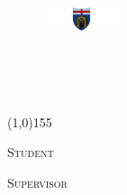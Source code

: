 \begin{frame}[plain,t]
	\begin{center}
		\scriptsize
		\textsc{\theInstitute}\\
		\vspace*{-0.35cm}\begin{figure}[htp]
			\centering\includegraphics[width=0.2\textwidth]{./figures/logo/unige.pdf}
    	\end{figure}
    	\vspace*{-0.3cm}
    	\textsc{\thePosition}\\
    	\scriptsize{\sc \theAccademicYear}\\
		\vfill

		\normalsize
	    {\em\textsc{\Large\theTitle}}\\
        \line(1,0){155}\\ 
        {\em\textsc{\theShortTitle}}
		\vfill

       \scriptsize
       \noindent\begin{minipage}{.4\linewidth}%
			{\textsc{Student}\hfill\\}
    		\theAuthor
		\end{minipage}\begin{minipage}{.4\linewidth}%
			\begin{flushright}
				\textsc{Supervisor}\\
    		  	\theProf
   		  	\end{flushright}
		\end{minipage}\\%
		\vfill
		\scriptsize\textsc{\theDate}\\
    \end{center}
\end{frame}
